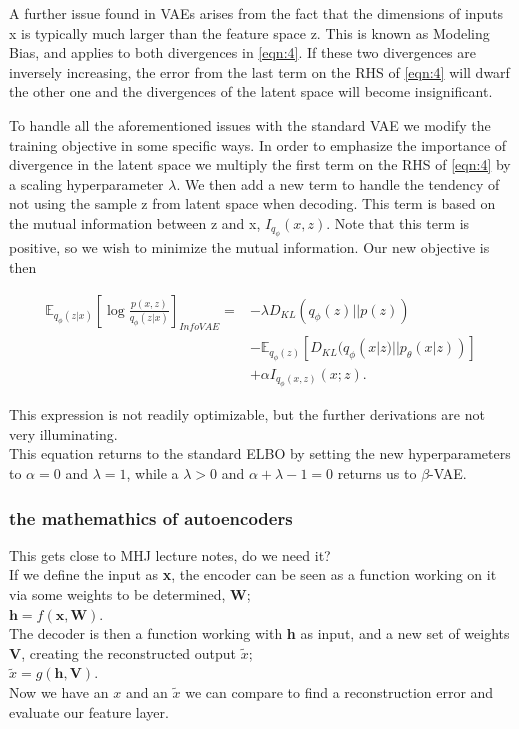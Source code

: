 A further issue found in VAEs arises from the fact that the dimensions of inputs x is typically much larger than the feature space z. This is known as Modeling Bias, and applies to both divergences in  \autoref{eqn:4}. If these two divergences are inversely increasing, the error from the last term on the RHS of \autoref{eqn:4} will dwarf the other one and the divergences of the latent space will become insignificant.

To handle all the aforementioned issues with the standard VAE we modify the training objective in some specific ways. In order to emphasize the importance of divergence in the latent space we multiply the first term on the RHS of \autoref{eqn:4} by a scaling hyperparameter $\lambda$. We then add a new term to handle the tendency of not using the sample z from latent space when decoding. This term is based on the mutual information between z and x, $I_{q_\phi}(x,z)$. Note that this term is positive, so we wish to minimize the mutual information. Our new objective is then

\begin{align}
 \mathbb{E}_{q_\phi(z|x)}\left[\log \frac{p(x,z)}{q_\phi(z|x)}  \right]_{InfoVAE}
 =&-\lambda D_{KL}(q_\phi(z)||p(z))\\ \nonumber
 &-\mathbb{E}_{q_\phi(z)}[D_{KL}(q_\phi(x|z)||p_\theta(x|z))]\\ \nonumber
 &+\alpha I_{q_\phi(x,z)}(x;z).
 \label{eqn:4}
\end{align}

This expression is not readily optimizable, but the further derivations are not very illuminating.\\
This equation returns to the standard ELBO by setting the new hyperparameters to $\alpha=0$ and $\lambda=1$, while a $\lambda > 0$ and $\alpha+\lambda-1=0$ returns us to $\beta$-VAE.


\subsubsection{the mathemathics of autoencoders}
This gets close to MHJ lecture notes, do we need it?\\
If we define the input as \textbf{x}, the encoder can be seen as a function working on it via some weights to be determined, \textbf{W}; \\$\textbf{h}=f(\mathbf{x},\mathbf{W})$.\\
The decoder is then a function working with \textbf{h} as input, and a new set of weights \textbf{V}, creating the reconstructed output $\tilde{x}$; \\$\tilde{x}=g(\mathbf{h},\mathbf{V})$.\\
Now we have an $x$ and an $\tilde{x}$ we can compare to find a reconstruction error and evaluate our feature layer.


